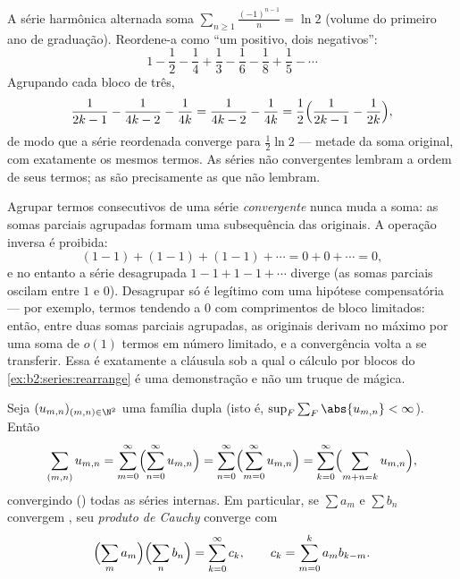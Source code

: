 \begin{example}\label{ex:b2:series:rearrange}
A série harmônica alternada soma
$\sum_{n\geq1}\frac{(-1)^{n-1}}{n} = \ln 2$ (volume do primeiro ano de
graduação). Reordene-a como ``um positivo, dois negativos'':
\[
1 - \frac12 - \frac14 + \frac13 - \frac16 - \frac18 + \frac15 -
\cdots
\]
Agrupando cada bloco de três,
\[
\frac{1}{2k-1} - \frac{1}{4k-2} - \frac1{4k}
= \frac{1}{4k-2} - \frac{1}{4k}
= \frac12\Bigl(\frac{1}{2k-1} - \frac1{2k}\Bigr),
\]
de modo que a série reordenada converge para $\frac12\ln 2$ --- metade da
soma original, com exatamente os mesmos termos. As séries
não  convergentes lembram a ordem de seus termos; as  são precisamente as que não lembram.
\end{example}

\begin{example}\label{ex:b2:series:grouping}
Agrupar termos consecutivos de uma série \emph{convergente} nunca
muda a soma: as somas parciais agrupadas formam uma subsequência das
originais. A operação inversa é proibida:
\[
(1 - 1) + (1 - 1) + (1 - 1) + \cdots = 0 + 0 + \cdots = 0,
\]
e no entanto a série desagrupada $1 - 1 + 1 - 1 + \cdots$ diverge (as somas
parciais oscilam entre $1$ e $0$). Desagrupar só é legítimo
com uma hipótese compensatória --- por exemplo, termos
tendendo a $0$ com comprimentos de bloco limitados: então, entre duas
somas parciais agrupadas, as originais derivam no máximo por uma soma de
$o(1)$ termos em número limitado, e a convergência volta a se transferir.
Essa é exatamente a cláusula sob a qual o cálculo por blocos do
\cref{ex:b2:series:rearrange} é uma demonstração e não um truque
de mágica.
\end{example}

\begin{theorem}\label{thm:b2:series:fubini}
Seja $(u_{m,n})_{(m,n) \in \N^2}$ uma família dupla  (isto é,
$\sup_F \sum_F \abs{u_{m,n}} < \infty$). Então
\[
\sum_{(m,n)} u_{m,n}
= \sum_{m=0}^{\infty}\Bigl(\sum_{n=0}^{\infty} u_{m,n}\Bigr)
= \sum_{n=0}^{\infty}\Bigl(\sum_{m=0}^{\infty} u_{m,n}\Bigr)
= \sum_{k=0}^{\infty}\Bigl(\sum_{m+n=k} u_{m,n}\Bigr),
\]
convergindo () todas as séries internas. Em particular, se $\sum
a_m$ e $\sum b_n$ convergem , seu \emph{produto
de Cauchy} converge  com
\[
\Bigl(\sum_m a_m\Bigr)\Bigl(\sum_n b_n\Bigr)
= \sum_{k=0}^{\infty} c_k,
\qquad
c_k = \sum_{m=0}^{k} a_m b_{k-m} .
\]
\end{theorem}

